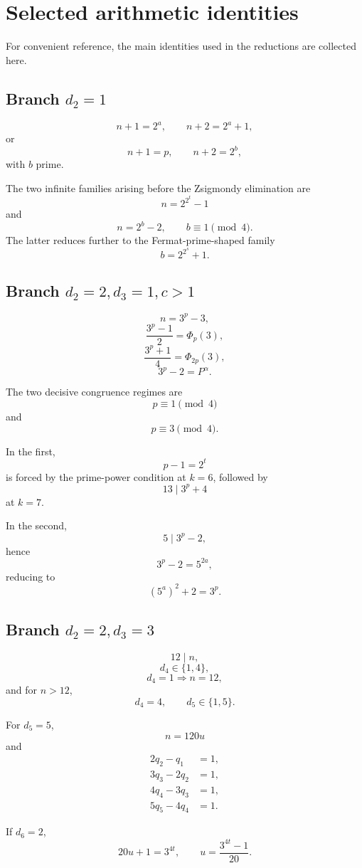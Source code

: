 \documentclass[11pt]{article}
\newcommand{\PhiC}{\Phi}
\begin{document}
\section{Selected arithmetic identities}

For convenient reference, the main identities used in the reductions are
collected here.

\subsection*{Branch \(d_2=1\)}

\[
n+1=2^a,\qquad n+2=2^a+1,
\]
or
\[
n+1=p,\qquad n+2=2^b,
\]
with \(b\) prime.

The two infinite families arising before the Zsigmondy elimination are
\[
n=2^{2^t}-1
\]
and
\[
n=2^b-2,\qquad b\equiv1\pmod4.
\]
The latter reduces further to the Fermat-prime-shaped family
\[
b=2^{2^s}+1.
\]

\subsection*{Branch \(d_2=2,d_3=1,c>1\)}

\[
n=3^p-3,
\]
\[
\frac{3^p-1}{2}=\PhiC_p(3),
\]
\[
\frac{3^p+1}{4}=\PhiC_{2p}(3),
\]
\[
3^p-2=P^\alpha.
\]

The two decisive congruence regimes are
\[
p\equiv1\pmod4
\]
and
\[
p\equiv3\pmod4.
\]

In the first,
\[
p-1=2^t
\]
is forced by the prime-power condition at \(k=6\), followed by
\[
13\mid3^p+4
\]
at \(k=7\).

In the second,
\[
5\mid3^p-2,
\]
hence
\[
3^p-2=5^{2a},
\]
reducing to
\[
(5^a)^2+2=3^p.
\]

\subsection*{Branch \(d_2=2,d_3=3\)}

\[
12\mid n,
\]
\[
d_4\in\{1,4\},
\]
\[
d_4=1\Longrightarrow n=12,
\]
and for \(n>12\),
\[
d_4=4,
\qquad
d_5\in\{1,5\}.
\]

For \(d_5=5\),
\[
n=120u
\]
and
\[
\begin{aligned}
2q_2-q_1&=1,\\
3q_3-2q_2&=1,\\
4q_4-3q_3&=1,\\
5q_5-4q_4&=1.
\end{aligned}
\]

If \(d_6=2\),
\[
20u+1=3^{4t},
\qquad
u=\frac{3^{4t}-1}{20}.
\]
\end{document}
